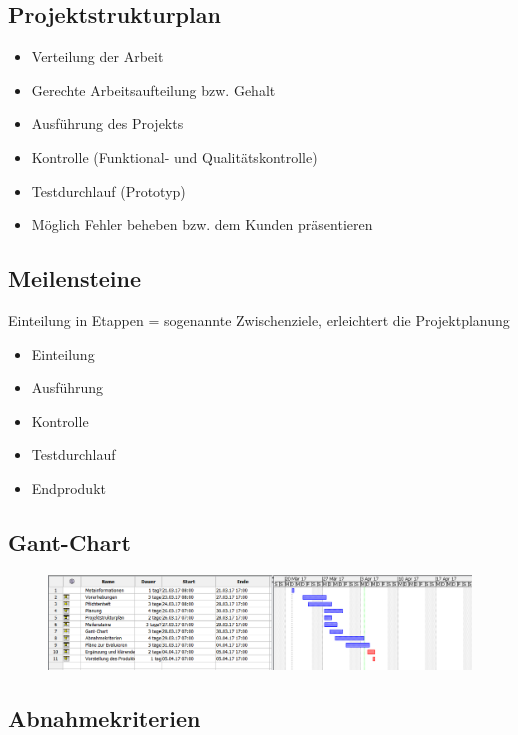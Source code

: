 \subsection{Projektstrukturplan}


\begin{itemize}
	\item Verteilung der Arbeit
	\item Gerechte Arbeitsaufteilung bzw. Gehalt
	\item Ausführung des Projekts
	\item Kontrolle (Funktional- und Qualitätskontrolle)
	\item Testdurchlauf (Prototyp)
	\item Möglich Fehler beheben bzw. dem Kunden präsentieren
\end{itemize}

\subsection{Meilensteine}

Einteilung in Etappen = sogenannte Zwischenziele, erleichtert die Projektplanung


\begin{itemize}
	\item Einteilung
	\item Ausführung
	\item Kontrolle
	\item Testdurchlauf
	\item Endprodukt
\end{itemize}





\subsection{Gant-Chart}
\begin{figure}
	\centering
	\includegraphics[width=1.8\linewidth]{screenshot002}
	\caption{}
	\label{fig:screenshot002}
\end{figure}




\subsection{Abnahmekriterien}


